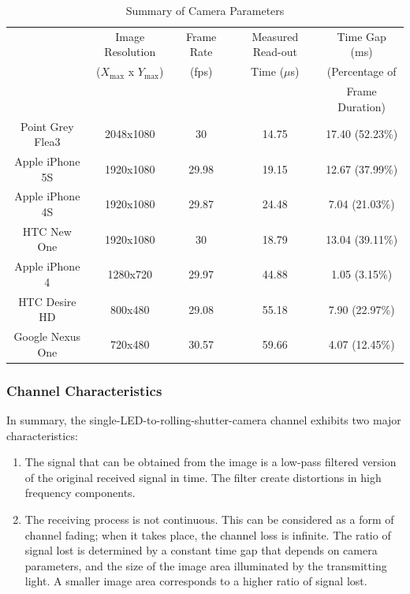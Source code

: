 \begin{table}[!htb]
\centering
\caption{Summary of Camera Parameters}
   \tabcolsep=0.08cm
    \begin{tabular}{c|c|c|c|c}
    \hline
	    & Image Resolution & Frame Rate & Measured Read-out & Time Gap (ms)    \\
	    &   ($X_{\max}$ x $Y_{\max}$)                &  (fps)          & Time ($\mu$s) &  (Percentage of       \\ 
	    &  &  &  &  Frame Duration)   \\    
    \hline \hline
    Point Grey Flea3 & 2048x1080          & 30         & 14.75                   & 17.40 (52.23\%) \\ \hline
    Apple iPhone 5S  & 1920x1080          & 29.98      & 19.15                   & 12.67 (37.99\%) \\ \hline
    Apple iPhone 4S  & 1920x1080          & 29.87      & 24.48                   & 7.04 (21.03\%) \\ \hline
   HTC New One      & 1920x1080          & 30         & 18.79                   & 13.04 (39.11\%) \\ \hline
    Apple iPhone 4   & 1280x720           & 29.97      & 44.88                   & 1.05 (3.15\%)  \\ \hline
    HTC Desire HD    & 800x480            & 29.08      & 55.18                   & 7.90 (22.97\%) \\ \hline
    Google Nexus One & 720x480            & 30.57      & 59.66                   & 4.07 (12.45\%) \\ \hline
    \end{tabular}
    \label{tab:readout}
\end{table}


\subsubsection{Channel Characteristics}
In summary, the single-LED-to-rolling-shutter-camera channel exhibits two major characteristics:
\begin{enumerate}
	\item The signal that can be obtained from the image is a low-pass filtered version of the original received signal in time. The filter create distortions in high frequency components.
	\item The receiving process is not continuous. This can be considered as a form of channel fading; when it takes place, the channel loss is infinite. The ratio of signal lost is determined by a constant time gap that depends on camera parameters, and the size of the image area illuminated by the transmitting light. A smaller image area corresponds to a higher ratio of signal lost.
\end{enumerate}



